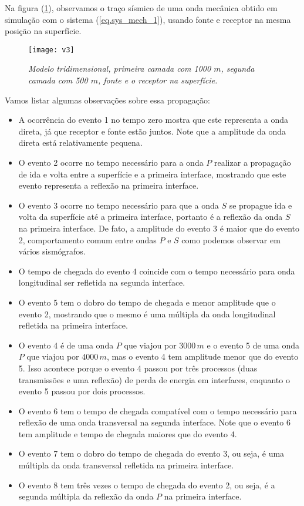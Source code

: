 Na figura (\ref{fig.v3}), observamos o tra\c{c}o s\'ismico de uma onda mec\^anica obtido em simula\c{c}\~ao com o sistema (\ref{eq.sys_mech_1}), usando fonte e receptor na mesma posi\c{c}\~ao na superf\'icie.
\begin{figure}
\centering
\texttt{[image: v3]}\\
\caption{\textit{Modelo tridimensional, primeira camada com 1000 $m$, segunda camada com 500 $m$, fonte e o receptor na superf\'icie.}}
\label{fig.v3}
\end{figure}
Vamos listar algumas observa\c{c}\~oes sobre essa propaga\c{c}\~ao:
\begin{itemize}
\item A ocorr\^encia do evento 1 no tempo zero mostra que este representa a onda direta, j\'a que receptor e fonte est\~ao juntos. Note que a amplitude da onda direta est\'a relativamente pequena.
\item O evento 2 ocorre no tempo necess\'ario para a onda $P$ realizar a propaga\c{c}\~ao de ida e volta entre a superf\'icie e a primeira interface, mostrando que este evento representa a reflex\~ao na primeira interface. 
\item O evento 3 ocorre no tempo necess\'ario para que a onda $S$ se propague ida e volta da superf\'icie at\'e a primeira interface, portanto \'e a reflex\~ao da onda $S$ na primeira interface. De fato, a amplitude do evento 3 \'e maior que do evento 2, comportamento comum entre ondas $P$ e $S$ como podemos observar em v\'arios sism\'ografos.
\item O tempo de chegada do evento 4 coincide com o tempo necess\'ario para onda longitudinal ser refletida na segunda interface.
\item O evento 5 tem o dobro do tempo de chegada e menor amplitude que o evento 2, mostrando que o mesmo \'e uma m\'ultipla da onda longitudinal refletida na primeira interface.
\item O evento 4 \'e de uma onda $P$ que viajou por $3000\,m$ e o evento 5 de uma onda $P$ que viajou por $4000\,m$, mas o evento 4 tem amplitude menor que do evento 5. Isso acontece porque o evento 4 passou por tr\^es processos (duas transmiss\~oes e uma reflex\~ao) de perda de energia em interfaces, enquanto o evento 5 passou por dois processos. 
\item O evento 6 tem o tempo de chegada compat\'ivel com o tempo necess\'ario para reflex\~ao de uma onda transversal na segunda interface. Note que o evento 6 tem amplitude e tempo de chegada maiores que do evento 4.
\item O evento 7 tem o dobro do tempo de chegada do evento 3, ou seja, \'e uma m\'ultipla da onda transversal refletida na primeira interface.
\item O evento 8 tem tr\^es vezes o tempo de chegada do evento 2, ou seja, \'e a segunda m\'ultipla da reflex\~ao da onda $P$ na primeira interface.
\end{itemize}

